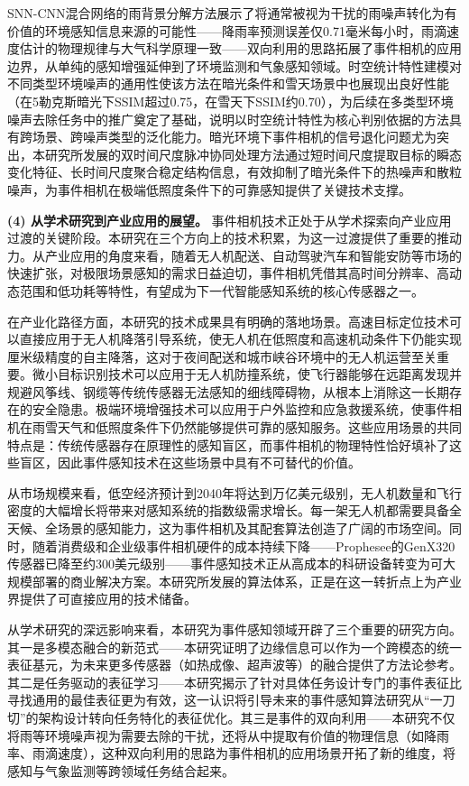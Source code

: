 SNN-CNN混合网络的雨背景分解方法展示了将通常被视为干扰的雨噪声转化为有价值的环境感知信息来源的可能性——降雨率预测误差仅0.71毫米每小时，雨滴速度估计的物理规律与大气科学原理一致——双向利用的思路拓展了事件相机的应用边界，从单纯的感知增强延伸到了环境监测和气象感知领域。时空统计特性建模对不同类型环境噪声的通用性使该方法在暗光条件和雪天场景中也展现出良好性能（在5勒克斯暗光下SSIM超过0.75，在雪天下SSIM约0.70），为后续在多类型环境噪声去除任务中的推广奠定了基础，说明以时空统计特性为核心判别依据的方法具有跨场景、跨噪声类型的泛化能力。暗光环境下事件相机的信号退化问题尤为突出，本研究所发展的双时间尺度脉冲协同处理方法通过短时间尺度提取目标的瞬态变化特征、长时间尺度聚合稳定结构信息，有效抑制了暗光条件下的热噪声和散粒噪声，为事件相机在极端低照度条件下的可靠感知提供了关键技术支撑。

\textbf{(4) 从学术研究到产业应用的展望。} 事件相机技术正处于从学术探索向产业应用过渡的关键阶段。本研究在三个方向上的技术积累，为这一过渡提供了重要的推动力。从产业应用的角度来看，随着无人机配送、自动驾驶汽车和智能安防等市场的快速扩张，对极限场景感知的需求日益迫切，事件相机凭借其高时间分辨率、高动态范围和低功耗等特性，有望成为下一代智能感知系统的核心传感器之一。

在产业化路径方面，本研究的技术成果具有明确的落地场景。高速目标定位技术可以直接应用于无人机降落引导系统，使无人机在低照度和高速机动条件下仍能实现厘米级精度的自主降落，这对于夜间配送和城市峡谷环境中的无人机运营至关重要。微小目标识别技术可以应用于无人机防撞系统，使飞行器能够在远距离发现并规避风筝线、钢缆等传统传感器无法感知的细线障碍物，从根本上消除这一长期存在的安全隐患。极端环境增强技术可以应用于户外监控和应急救援系统，使事件相机在雨雪天气和低照度条件下仍然能够提供可靠的感知服务。这些应用场景的共同特点是：传统传感器存在原理性的感知盲区，而事件相机的物理特性恰好填补了这些盲区，因此事件感知技术在这些场景中具有不可替代的价值。

从市场规模来看，低空经济预计到2040年将达到万亿美元级别，无人机数量和飞行密度的大幅增长将带来对感知系统的指数级需求增长。每一架无人机都需要具备全天候、全场景的感知能力，这为事件相机及其配套算法创造了广阔的市场空间。同时，随着消费级和企业级事件相机硬件的成本持续下降——Prophesee的GenX320传感器已降至约300美元级别——事件感知技术正从高成本的科研设备转变为可大规模部署的商业解决方案。本研究所发展的算法体系，正是在这一转折点上为产业界提供了可直接应用的技术储备。

从学术研究的深远影响来看，本研究为事件感知领域开辟了三个重要的研究方向。其一是多模态融合的新范式——本研究证明了边缘信息可以作为一个跨模态的统一表征基元，为未来更多传感器（如热成像、超声波等）的融合提供了方法论参考。其二是任务驱动的表征学习——本研究揭示了针对具体任务设计专门的事件表征比寻找通用的最佳表征更为有效，这一认识将引导未来的事件感知算法研究从“一刀切”的架构设计转向任务特化的表征优化。其三是事件的双向利用——本研究不仅将雨等环境噪声视为需要去除的干扰，还将从中提取有价值的物理信息（如降雨率、雨滴速度），这种双向利用的思路为事件相机的应用场景开拓了新的维度，将感知与气象监测等跨领域任务结合起来。

